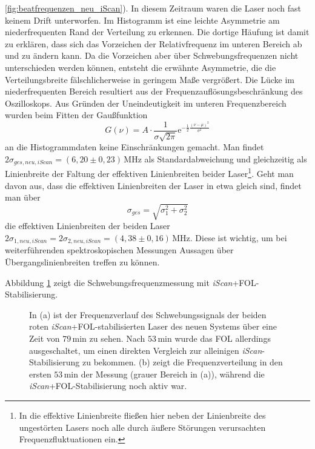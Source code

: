 \ref{fig:beatfrequenzen_neu_iScan}).
In diesem Zeitraum waren die Laser noch fast keinem Drift unterworfen. Im
Histogramm ist eine leichte Asymmetrie am niederfrequenten Rand der Verteilung
zu erkennen. Die dortige Häufung ist damit zu erklären, dass sich das Vorzeichen
der Relativfrequenz im unteren Bereich ab und zu ändern kann. Da die Vorzeichen
aber über Schwebungsfrequenzen nicht unterschieden werden können, entsteht die erwähnte
Asymmetrie, die die Verteilungsbreite fälschlicherweise in geringem Maße
vergrößert. Die Lücke im niederfrequenten Bereich resultiert aus der Frequenzauflösungsbeschränkung des Oszilloskops. Aus Gründen der Uneindeutigkeit
im unteren Frequenzbereich wurden beim Fitten der Gaußfunktion
\begin{equation}\label{eq:schwebungsfrequenzen_gauss}
	G(\nu)=A\cdot\frac{1}{\sigma\sqrt{2\pi}}\mathrm{e}^{-\frac{1}{2}\frac{(\nu-\mu)^2}{\sigma^2}}
\end{equation}
an die Histogrammdaten keine Einschränkungen gemacht. Man findet
$2\sigma_{ges,neu,iScan}=(6,20\pm0,23)\,$MHz als
Standardabweichung und gleichzeitig als Linienbreite der Faltung der effektiven Linienbreiten beider
Laser\footnote{In die effektive Linienbreite fließen hier neben der Linienbreite
des ungestörten Lasers noch alle durch äußere Störungen verursachten
Frequenzfluktuationen ein.}. Geht man davon aus, dass die effektiven
Linienbreiten der Laser in etwa gleich sind, findet man über
\begin{equation}\label{eq:schwebungsfrequenzen_linienbreite}
	\sigma_{ges}=\sqrt{\sigma_1^2+\sigma_2^2}
\end{equation}
die effektiven Linienbreiten der beiden Laser
$2\sigma_{1,neu,iScan}=2\sigma_{2,neu,iScan}=(4,38\pm0,16)\,$MHz. Diese ist
wichtig, um bei weiterführenden spektroskopischen Messungen Aussagen über
Übergangslinienbreiten treffen zu können.\par
Abbildung \ref{fig:beatfrequenzen_neu_iScan+FOL} zeigt die
Schwebungsfrequenzmessung mit \textit{iScan}+FOL-Stabilisierung.
\begin{figure}[hp]
 	\centering
 	\footnotesize
 	\fbox{\parbox{\dimexpr \linewidth - 2\fboxrule - 2\fboxsep}{
 	\subfloat[]{
		\label{subfig:beatfrequenzen_neu_iScan+FOL_drift}
		
		}\\
 	\subfloat[]{
		\label{subfig:beatfrequenzen_neu_iScan+FOL_histogramm}
		
		}
	}}
	\caption[Beatfrequenzen - neues System mit \textit{iScan}+FOL]{In (a) ist der
	Frequenzverlauf des Schwebungssignals der beiden roten
	\textit{iScan}+FOL-stabilisierten Laser des neuen Systems über eine Zeit von
	$79\,$min zu sehen. Nach $53\,$min wurde das FOL allerdings ausgeschaltet, um
	einen direkten Vergleich zur alleinigen \textit{iScan}-Stabilisierung zu
	bekommen. (b) zeigt die Frequenzverteilung in den ersten $53\,$min der Messung
	(grauer Bereich in (a)), während die \textit{iScan}+FOL-Stabilisierung noch
	aktiv war.}
	\label{fig:beatfrequenzen_neu_iScan+FOL}
\end{figure}
